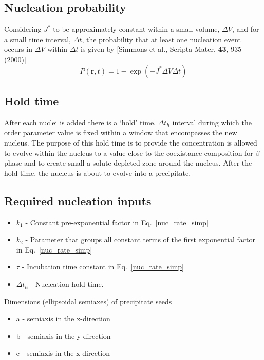 \documentclass[11pt]{article}
\renewcommand{\=}[1]{\stackrel{#1}{=}} %
\theoremstyle{definition}
\theoremstyle{remark}
\begin{document}
\subsection{Nucleation probability}

Considering  $J^*$ to be approximately constant within a small volume, $\Delta V$, and for a small time interval, $\Delta t$, the probability that at least one nucleation event occurs in $\Delta V$ within $\Delta t$ is given by [Simmons et al., Scripta Mater. {\bf 43}, 935 (2000)]
\\
\begin{equation}
\label{nuc_prob}
P(\mathbf{r},t) = 1 - \exp \left( -J^* \Delta V \Delta t \right)
\end{equation}
\subsection{Hold time}

After each nuclei is added there is a `hold' time, $\Delta t_h$ interval during which the order parameter value is fixed within a window that encompasses the new nucleus. The purpose of this hold time is to provide the concentration is allowed to evolve within the nucleus to a value close to the coexistance composition for $\beta$ phase and to create small a solute depleted zone around the nucleus. After the hold time, the nucleus is about to evolve into a precipitate.

\subsection{Required nucleation inputs}
\begin{itemize}
\item $k_1$ - Constant pre-exponential factor in Eq.~\eqref{nuc_rate_simp}
\item $k_2$ - Parameter that groups all constant terms of the first exponential factor in Eq.~\eqref{nuc_rate_simp} 
\item $\tau$ - Incubation time constant in Eq.~\eqref{nuc_rate_simp}
\item $\Delta t_h$ - Nucleation hold time.
\end{itemize}
Dimensions (ellipsoidal semiaxes) of precipitate seeds
\begin{itemize}
\item a - semiaxis in the x-direction
\item b - semiaxis in the y-direction
\item c - semiaxis in the x-direction
\end{itemize}
\end{document}
